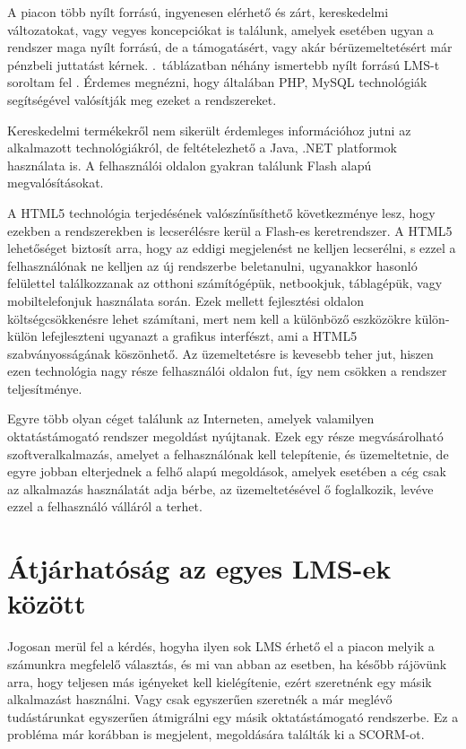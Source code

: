 A piacon több nyílt forrású, ingyenesen elérhető és zárt, kereskedelmi változatokat, vagy vegyes koncepciókat is találunk, amelyek esetében ugyan a rendszer maga nyílt forrású, de a támogatásért, vagy akár bérüzemeltetésért már pénzbeli juttatást kérnek. .~táblázatban néhány ismertebb nyílt forrású LMS-t soroltam fel \cite{lms}. Érdemes megnézni, hogy általában PHP, MySQL technológiák segítségével valósítják meg ezeket a rendszereket.



Kereskedelmi termékekről nem sikerült érdemleges információhoz jutni az alkalmazott technológiákról, de feltételezhető a Java, .NET platformok használata is. A felhasználói oldalon gyakran találunk Flash alapú megvalósításokat.

A HTML5 technológia terjedésének valószínűsíthető következménye lesz, hogy ezekben a rendszerekben is lecserélésre kerül a Flash-es keretrendszer. A HTML5 lehetőséget biztosít arra, hogy az eddigi megjelenést ne kelljen lecserélni, s ezzel a felhasználónak ne kelljen az új rendszerbe beletanulni, ugyanakkor hasonló felülettel találkozzanak az otthoni számítógépük, netbookjuk, táblagépük, vagy mobiltelefonjuk használata során. Ezek mellett fejlesztési oldalon költségcsökkenésre lehet számítani, mert nem kell a különböző eszközökre külön-külön lefejleszteni ugyanazt a grafikus interfészt, ami a HTML5 szabványosságának köszönhető. Az üzemeltetésre is kevesebb teher jut, hiszen ezen technológia nagy része felhasználói oldalon fut, így nem csökken a rendszer teljesítménye.

Egyre több olyan céget találunk az Interneten, amelyek valamilyen oktatástámogató rendszer megoldást nyújtanak. Ezek egy része megvásárolható szoftveralkalmazás, amelyet a felhasználónak kell telepítenie, és üzemeltetnie, de egyre jobban elterjednek a felhő alapú megoldások, amelyek esetében a cég csak az alkalmazás használatát adja bérbe, az üzemeltetésével ő foglalkozik, levéve ezzel a felhasználó válláról a terhet.

\section{Átjárhatóság az egyes LMS-ek között}

Jogosan merül fel a kérdés, hogyha ilyen sok LMS érhető el a piacon melyik a számunkra megfelelő választás, és mi van abban az esetben, ha később rájövünk arra, hogy teljesen más igényeket kell kielégítenie, ezért szeretnénk egy másik alkalmazást használni. Vagy csak egyszerűen szeretnék a már meglévő tudástárunkat egyszerűen átmigrálni egy másik oktatástámogató rendszerbe. Ez a probléma már korábban is megjelent, megoldására találták ki a SCORM-ot.

